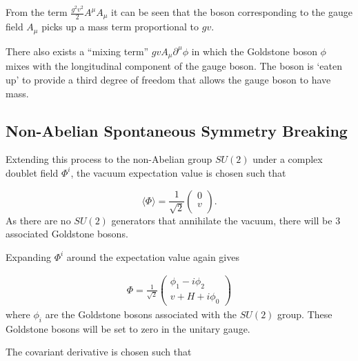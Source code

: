 \documentclass{article}
\begin{document}
From the term $\frac{g^2v^2}{2}A^\mu A_\mu$ it can be seen that the boson corresponding to the gauge field $A_\mu$ picks up a mass term proportional to $gv$.

There also exists a ``mixing term'' $gvA_\mu\partial^\mu\phi$ in which the Goldstone boson $\phi$ mixes with the longitudinal component of the gauge boson. The boson is `eaten up' to provide a third degree of freedom that allows the gauge boson to have mass. 
\subsection{Non-Abelian Spontaneous Symmetry Breaking}%
\label{sec:SM_naSSB}
Extending this process to the non-Abelian group $SU(2)$ under a complex doublet field $\Phi^i$, the vacuum expectation value is chosen such that

\begin{equation}
\langle\Phi\rangle = \frac{1}{\sqrt{2}}\left(\begin{matrix}
0 \\
v \\
\end{matrix}\right).
\end{equation}
As there are no $SU(2)$ generators that annihilate the vacuum, there will be 3 associated Goldstone bosons.


Expanding $\Phi^i$ around the expectation value again gives

\begin{equation}
\begin{split}
\Phi = \frac{1}{\sqrt{2}}\left(
\begin{matrix}
\phi_1 - i\phi_2 \\
v + H + i\phi_0
\end{matrix}\right)
\end{split}
\end{equation}
where $\phi_i$ are the Goldstone bosons associated with the $SU(2)$ group. These Goldstone bosons will be set to zero in the unitary gauge.

The covariant derivative is chosen such that
\end{document}
